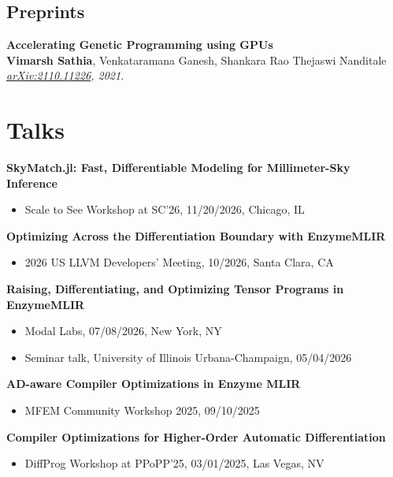 \documentclass[11pt,letterpaper]{article}
\newcommand{\me}{\textbf{Vimarsh Sathia}}
\newenvironment{tagged}[1]{%
  \begin{description}[leftmargin=#1, labelwidth=\dimexpr#1-0.8em\relax,
    labelsep=0.8em, align=right, font=\normalfont, itemsep=1pt, topsep=1pt]}
  {\end{description}}
\newcommand{\pub}[4]{\begin{minipage}[t]{\linewidth}\raggedright\textbf{#1}\\ #2\\ \textit{#3}#4\end{minipage}}
\begin{document}
\subsection*{Preprints}
\begin{tagged}{7.6em}
  \item[{[arXiv'21]}] \pub{Accelerating Genetic Programming using GPUs}
    {\me, Venkataramana Ganesh, Shankara Rao Thejaswi Nanditale}
    {\href{https://arxiv.org/abs/2110.11226}{arXiv:2110.11226}, 2021.}{}
\end{tagged}

\section{Talks}
\textbf{SkyMatch.jl: Fast, Differentiable Modeling for Millimeter-Sky Inference}
\begin{itemize}
  \item Scale to See Workshop at SC'26, 11/20/2026, Chicago, IL
\end{itemize}

\textbf{Optimizing Across the Differentiation Boundary with EnzymeMLIR}
\begin{itemize}
  \item 2026 US LLVM Developers' Meeting, 10/2026, Santa Clara, CA
\end{itemize}

\textbf{Raising, Differentiating, and Optimizing Tensor Programs in EnzymeMLIR}
\begin{itemize}
  \item Modal Labs, 07/08/2026, New York, NY
  \item Seminar talk, University of Illinois Urbana-Champaign, 05/04/2026
\end{itemize}

\textbf{AD-aware Compiler Optimizations in Enzyme MLIR}
\begin{itemize}
  \item MFEM Community Workshop 2025, 09/10/2025
\end{itemize}

\textbf{Compiler Optimizations for Higher-Order Automatic Differentiation}
\begin{itemize}
  \item DiffProg Workshop at PPoPP'25, 03/01/2025, Las Vegas, NV
\end{itemize}

\end{document}
